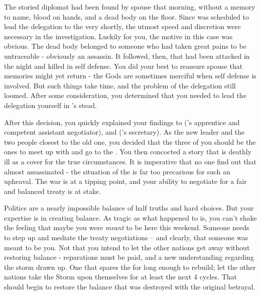 \documentclass[char]{GL2020}
\begin{document}
The storied diplomat \cHeadDiplomat{} had been found by \cHeadDiplomat{\their} spouse that morning, without a memory to \cHeadDiplomat{\their} name, blood on \cHeadDiplomat{\their} hands, and a dead body on the floor. Since \cHeadDiplomat{} was scheduled to lead the delegation to the \pSc{} very shortly, the utmost speed and discretion were necessary in the investigation. Luckily for you, the motive in this case was obvious. The dead body belonged to someone who had taken great pains to be untraceable - obviously an assassin. It followed, then, that \cHeadDiplomat{} had been attacked in the night and killed in self defense. You did your best to reassure \cHeadDiplomat{\their} spouse that \cHeadDiplomat{\their} memories might yet return - the Gods are sometimes merciful when self defense is involved. But such things take time, and the problem of the delegation still loomed. After some consideration, you determined that you needed to lead the delegation yourself in \cHeadDiplomat{}’s stead.

After this decision, you quickly explained your findings to \cJuniorStatesman{} (\cHeadDiplomat{}’s apprentice and competent assistant negotiator), and \cChupLeader{} (\cHeadDiplomat{}’s secretary). As the new leader and the two people closest to the old one, you decided that the three of you should be the ones to meet up with \cBunker{} and go to the \pSc{}. You then concocted a story that \cHeadDiplomat{} is deathly ill as a cover for the true circumstances. It is imperative that no one find out that \cHeadDiplomat{\they} \cHeadDiplomat{\were} almost assassinated - the situation of the \pShip{} is far too precarious for such an upheaval. The war is at a tipping point, and your ability to negotiate for a fair and balanced treaty is at stake.

Politics are a nearly impossible balance of half truths and hard choices. But your expertise is in creating balance. As tragic as what happened to \cHeadDiplomat{} is, you can’t shake the feeling that maybe you were \emph{meant} to be here this weekend. Someone needs to step up and mediate the treaty negotiations -- and clearly, that someone was meant to be you. Not that you intend to let the other nations get away without restoring balance - reparations must be paid, and a new understanding regarding the storm drawn up. One that spares the \pShip{} for long enough to rebuild; let the other nations take the Storm upon themselves for at least the next 4 cycles. That should begin to restore the balance that was destroyed with the original betrayal.
\end{document}
